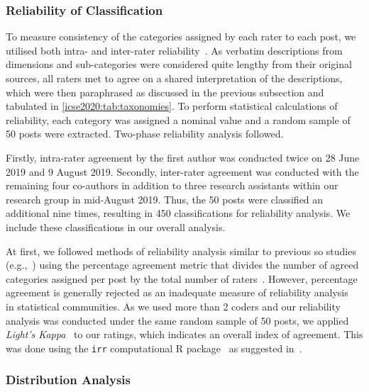 \subsubsection{Reliability of Classification}
\label{icse2020:ssec:method:filtering:reliability}

To measure consistency of the categories assigned by each rater to each post, we utilised both intra- and inter-rater reliability~\citep{McHugh:2012up}. As verbatim descriptions from dimensions and sub-categories were considered quite lengthy from their original sources, all raters met to agree on a shared interpretation of the descriptions, which were then paraphrased as discussed in the previous subsection and tabulated in \cref{icse2020:tab:taxonomies}. To perform statistical calculations of reliability, each category was assigned a nominal value and a random sample of 50 posts were extracted. Two-phase reliability analysis followed.

Firstly, intra-rater agreement by the first author was conducted twice on 28 June 2019 and 9 August 2019. Secondly, inter-rater agreement was conducted with the remaining four co-authors in addition to three research assistants within our research group in mid-August 2019. Thus, the 50 posts were classified an additional nine times, resulting in 450 classifications for reliability analysis. We include these classifications in our overall analysis.

At first, we followed methods of reliability analysis similar to previous \gls{so} studies (e.g.,~\citep{Tahir:2018ks}) using the percentage agreement metric that divides the number of agreed categories assigned per post by the total number of raters~\citep{McHugh:2012up}. However, percentage agreement is generally rejected as an inadequate measure of reliability analysis~\citep{Cohen:1960tf,Krippendorff:2018tda,Hallgren:2012kt} in statistical communities. As we used more than 2 coders and our reliability analysis was conducted under the same random sample of 50 posts, we applied \textit{Light's Kappa}~\citep{Light:1971vz} to our ratings, which indicates an overall index of agreement. This was done using the \texttt{irr} computational R package~\citep{Gamer:tj} as suggested in~\citep{Hallgren:2012kt}.

\subsubsection{Distribution Analysis}

